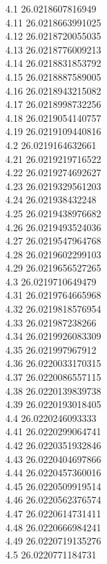 {4.1	26.0218607816949\\
4.11	26.0218663991025\\
4.12	26.0218720055035\\
4.13	26.0218776009213\\
4.14	26.0218831853792\\
4.15	26.0218887589005\\
4.16	26.0218943215082\\
4.17	26.0218998732256\\
4.18	26.0219054140757\\
4.19	26.0219109440816\\
4.2	26.0219164632661\\
4.21	26.0219219716522\\
4.22	26.0219274692627\\
4.23	26.0219329561203\\
4.24	26.021938432248\\
4.25	26.0219438976682\\
4.26	26.0219493524036\\
4.27	26.0219547964768\\
4.28	26.0219602299103\\
4.29	26.0219656527265\\
4.3	26.0219710649479\\
4.31	26.0219764665968\\
4.32	26.0219818576954\\
4.33	26.021987238266\\
4.34	26.0219926083309\\
4.35	26.021997967912\\
4.36	26.0220033170315\\
4.37	26.0220086557115\\
4.38	26.0220139839738\\
4.39	26.0220193018405\\
4.4	26.0220246093333\\
4.41	26.0220299064741\\
4.42	26.0220351932846\\
4.43	26.0220404697866\\
4.44	26.0220457360016\\
4.45	26.0220509919514\\
4.46	26.0220562376574\\
4.47	26.0220614731411\\
4.48	26.0220666984241\\
4.49	26.0220719135276\\
4.5	26.0220771184731\\
}
